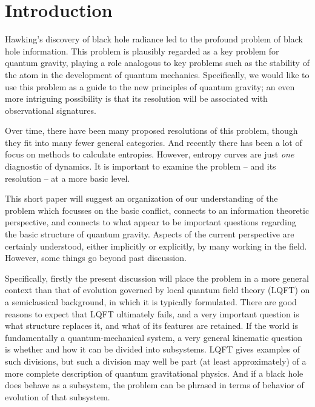 \documentclass[11pt]{article}
\numberwithin{equation}{section}
\begin{document}
\tableofcontents

\newpage

\section{Introduction}

Hawking's discovery\cite{Hawk} of black hole radiance led to the profound problem of black hole information.  This problem is plausibly  regarded as a key problem for quantum gravity, playing a role analogous to key problems such as the stability of the atom in the development of quantum mechanics.  Specifically, we would like to use this problem as a guide to the new principles of quantum gravity; an even more intriguing possibility is that its resolution will be associated with observational signatures.

Over time, there have been many proposed resolutions of this problem, though they fit into many fewer general categories.  And recently there has been a lot of focus on methods to calculate entropies\cite{AEMM,AMMZ,PSSY,AHMST,AHMSTrev}.  However, entropy curves are just {\it one} diagnostic of dynamics.  It is important to examine the problem -- and its resolution -- at a more basic level.

This short paper will suggest an organization of our understanding of the problem which focusses on the basic conflict,  connects to an information theoretic perspective, and connects to  what appear to be important questions regarding the basic structure of quantum gravity.  Aspects of the current perspective are certainly understood, either implicitly or explicitly, by many working in the field.  However, some things go beyond past discussion.

Specifically, firstly the present discussion will  place the problem in a more general context than that of evolution governed by local quantum field theory (LQFT) on a semiclassical background, in which it is typically formulated.  There are good reasons to expect that LQFT ultimately fails, and a very important question is what structure replaces it, and what of its features are retained.  If the world is fundamentally a quantum-mechanical system, a very general kinematic question is whether and how it can be divided into subsystems.  LQFT gives examples of such divisions, but such a division may well be part  (at least approximately) of a more complete description of quantum gravitational physics.  And if a black hole does behave as a subsystem, the problem can be phrased in terms of behavior of evolution of that subsystem.
\end{document}
